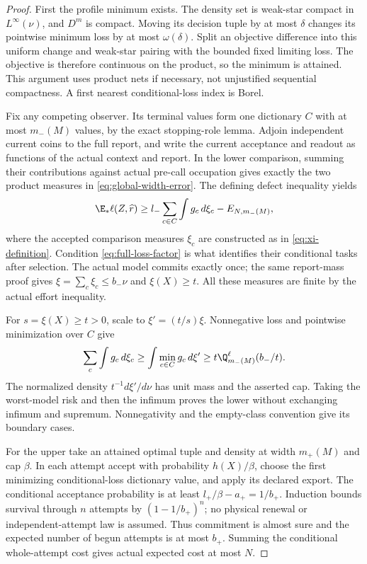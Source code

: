 \begin{proof}
First the profile minimum exists. The density set is weak-star compact in $L^\infty(\nu)$, and $D^m$ is compact. Moving its decision tuple by at most $\delta$ changes its pointwise minimum loss by at most $\omega(\delta)$. Split an objective difference into this uniform change and weak-star pairing with the bounded fixed limiting loss. The objective is therefore continuous on the product, so the minimum is attained. This argument uses product nets if necessary, not unjustified sequential compactness. A first nearest conditional-loss index is Borel.

Fix any competing observer. Its terminal values form one dictionary $C$ with at most $m_-(M)$ values, by the exact stopping-role lemma. Adjoin independent current coins to the full report, and write the current acceptance and readout as functions of the actual context and report. In the lower comparison, summing their contributions against actual pre-call occupation gives exactly the two product measures in \eqref{eq:global-width-error}. The defining defect inequality yields
\[
 \E_*\ell(Z,\widehat r)
 \ge l_-\sum_{c\in C}\int g_c\,d\xi_c-E_{N,m_-(M)},
\]
where the accepted comparison measures $\xi_c$ are constructed as in \eqref{eq:xi-definition}. Condition \eqref{eq:full-loss-factor} is what identifies their conditional tasks after selection. The actual model commits exactly once; the same report-mass proof gives $\xi=\sum_c\xi_c\le b_-\nu$ and $\xi(X)\ge t$. All these measures are finite by the actual effort inequality.

For $s=\xi(X)\ge t>0$, scale to $\xi'=(t/s)\xi$. Nonnegative loss and pointwise minimization over $C$ give
\[
 \sum_c\int g_c\,d\xi_c
 \ge\int\min_{c\in C}g_c\,d\xi'
 \ge t\Q_{m_-(M)}^\ell(b_-/t).
\]
The normalized density $t^{-1}d\xi'/d\nu$ has unit mass and the asserted cap. Taking the worst-model risk and then the infimum proves the lower without exchanging infimum and supremum. Nonnegativity and the empty-class convention give its boundary cases.

For the upper take an attained optimal tuple and density at width $m_+(M)$ and cap $\beta$. In each attempt accept with probability $h(X)/\beta$, choose the first minimizing conditional-loss dictionary value, and apply its declared export. The conditional acceptance probability is at least $l_+/\beta-a_+=1/b_+$. Induction bounds survival through $n$ attempts by $(1-1/b_+)^n$; no physical renewal or independent-attempt law is assumed. Thus commitment is almost sure and the expected number of begun attempts is at most $b_+$. Summing the conditional whole-attempt cost gives actual expected cost at most $N$.


\end{proof}
